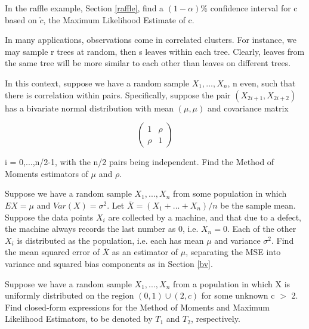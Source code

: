 \oneproblem
In the raffle example, Section \ref{raffle}, find a $(1-\alpha)$\%
confidence interval for c based on $\check{c}$, the Maximum Likelihood
Estimate of c.

\oneproblem
In many applications, observations come in correlated clusters.  For
instance, we may sample r trees at random, then s leaves within each
tree.  Clearly, leaves from the same tree will be more similar to each
other than leaves on different trees.

In this context, suppose we have a random sample $X_1,...,X_n$, n even,
such that there is correlation within pairs.  Specifically, suppose
the pair $(X_{2i+1},X_{2i+2})$ has a bivariate normal distribution with
mean $(\mu,\mu)$ and covariance matrix

\begin{equation}
\left (
   \begin{array}{rr}
   1 & \rho \\
   \rho & 1
   \end{array}
\right )
\end{equation}

i = 0,...,n/2-1, with the n/2 pairs being independent.  Find the Method
of Moments estimators of $\mu$ and $\rho$.

\oneproblem
Suppose we have a random sample $X_1,...,X_n$ from some
population in which $EX = \mu$ and $Var(X) = \sigma^2$.  Let
$\overline{X} = (X_1+...+X_n)/n$ be the sample mean.  Suppose the data
points $X_i$ are collected by a machine, and that due to a defect, the
machine always records the last number as 0, i.e. $X_n = 0$.  Each of
the other $X_i$ is distributed as the population, i.e. each has mean
$\mu$ and variance $\sigma^2$.  Find the mean squared error of
$\overline{X}$ as an estimator of $\mu$, separating the MSE into
variance and squared bias components as in Section \ref{bv}.

\oneproblem
Suppose we have a random sample $X_1,...,X_n$ from a population in which
X is uniformly distributed on the region $(0,1) \cup (2,c)$ for some
unknown c $>$ 2. Find closed-form expressions for the Method of Moments
and Maximum Likelihood Estimators, to be denoted by $T_1$ and $T_2$,
respectively.  
